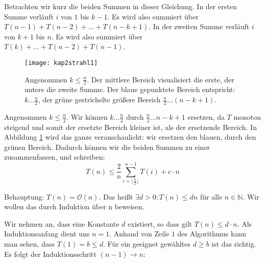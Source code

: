 Betrachten wir kurz die beiden Summen in dieser Gleichung. In der ersten Summe verläuft $i$ von $1$ bis $k-1$. Es wird also summiert über $T(n-1) + T(n-2) + \ldots + T(n-k+1)$. In der zweiten Summe verläuft $i$ von $k+1$ bis $n$. Es wird also summiert über $T(k) + \ldots + T(n-2) + T(n-1)$.

\begin{figure}[hbt]
  \centering
  \texttt{[image: kap2strahl1]}
  \caption{Angenommen $k \leq \frac{n}{2}$. Der mittlere Bereich visualisiert die erste, der untere die zweite Summe. Der blaue gepunktete Bereich entspricht: $k \ldots \frac{n}{2}$, der grüne gestrichelte größere Bereich $\frac{n}{2} \ldots (n-k+1)$.}
  \label{kap2strahl1}
\end{figure}

Angenommen $k \leq \frac{n}{2}$. Wir können $k \ldots \frac{n}{2}$ durch $\frac{n}{2} \ldots n-k+1$ ersetzen, da $T$ monoton steigend und somit der ersetzte Bereich kleiner ist, als der ersetzende Bereich. In Abbildung \ref{kap2strahl1} wird das ganze veranschaulicht: wir ersetzen den blauen, durch den grünen Bereich. Dadurch können wir die beiden Summen zu einer zusammenfassen, und schreiben:
\[T(n) \leq \frac{2}{n} \sum_{i= \lfloor \frac{n}{2} \rfloor}^{n-1} T(i) + c \cdot n\]

Behauptung: $T(n) = \mathcal{O}(n)$. Das heißt $\exists{} d > 0 : T(n) \le d n$ für alle $n \in \mathbb{N}$. Wir wollen das durch Induktion über n beweisen.

Wir nehmen an, dass eine Konstante $d$ existiert, so dass gilt $T(n) \le d \cdot n$.
Als Induktionsanfang dient uns $n=1$. Anhand von Zeile $1$ des Algorithmus kann man sehen, dass $T(1) = b \le d$. Für ein geeignet gewähltes $d \ge b$ ist das richtig.
Es folgt der Induktionsschritt $(n-1) \rightarrow n$:

